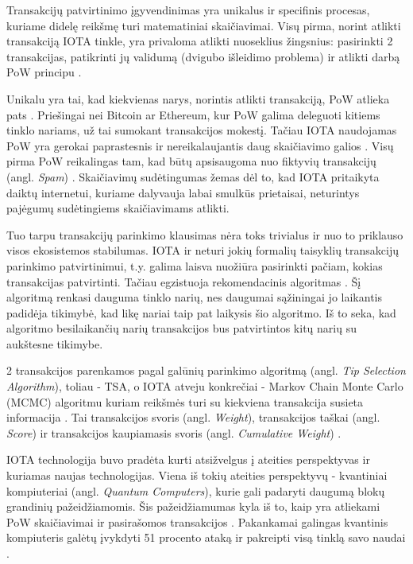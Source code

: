 Transakcijų patvirtinimo įgyvendinimas yra unikalus ir specifinis procesas, kuriame didelę reikšmę turi matematiniai skaičiavimai. Visų pirma, norint atlikti transakciją IOTA tinkle, yra privaloma atlikti nuoseklius žingsnius: pasirinkti 2 transakcijas, patikrinti jų validumą (dvigubo išleidimo problema) ir atlikti darbą PoW principu \cite{popov2016tangle}. 

Unikalu yra tai, kad kiekvienas narys, norintis atlikti transakciją, PoW atlieka pats \cite{bramas2018stability}. Priešingai nei Bitcoin ar Ethereum, kur PoW galima deleguoti kitiems tinklo nariams, už tai sumokant transakcijos mokestį. Tačiau IOTA naudojamas PoW yra gerokai paprastesnis ir nereikalaujantis daug skaičiavimo galios \cite{popov2016tangle}. Visų pirma PoW reikalingas tam, kad būtų apsisaugoma nuo fiktyvių transakcijų (angl. \textit{Spam}) \cite{popov2016tangle}. Skaičiavimų sudėtingumas žemas dėl to, kad IOTA pritaikyta daiktų internetui, kuriame dalyvauja labai smulkūs prietaisai, neturintys pajėgumų sudėtingiems skaičiavimams atlikti.

Tuo tarpu transakcijų parinkimo klausimas nėra toks trivialus ir nuo to priklauso visos ekosistemos stabilumas. IOTA ir neturi jokių formalių taisyklių transakcijų parinkimo patvirtinimui, t.y. galima laisva nuožiūra pasirinkti pačiam, kokias transakcijas patvirtinti. Tačiau egzistuoja rekomendacinis algoritmas \cite{popov2016tangle}. Šį algoritmą renkasi dauguma tinklo narių, nes daugumai sąžiningai jo laikantis padidėja tikimybė, kad likę nariai taip pat laikysis šio algoritmo. Iš to seka, kad algoritmo besilaikančių narių transakcijos bus patvirtintos kitų narių su aukštesne tikimybe.

2 transakcijos parenkamos pagal galūnių parinkimo algoritmą (angl. \textit{Tip Selection Algorithm}), toliau - TSA, o IOTA atveju konkrečiai - Markov Chain Monte Carlo (MCMC) algoritmu kuriam reikšmės turi su kiekviena transakcija susieta informacija \cite{bramas2018stability}. Tai transakcijos svoris (angl. \textit{Weight}), transakcijos taškai (angl. \textit{Score}) ir transakcijos kaupiamasis svoris (angl. \textit{Cumulative Weight}) \cite{popov2016tangle}. 

IOTA technologija buvo pradėta kurti atsižvelgus į ateities perspektyvas ir kuriamas naujas technologijas. Viena iš tokių ateities perspektyvų - kvantiniai kompiuteriai (angl. \textit{Quantum Computers}), kurie gali padaryti daugumą blokų grandinių pažeidžiamomis. Šis pažeidžiamumas kyla iš to, kaip yra atliekami PoW skaičiavimai ir pasirašomos transakcijos \cite{kiktenko2018quantum}. Pakankamai galingas kvantinis kompiuteris galėtų įvykdyti 51 procento ataką ir pakreipti visą tinklą savo naudai \cite{kiktenko2018quantum}. 

